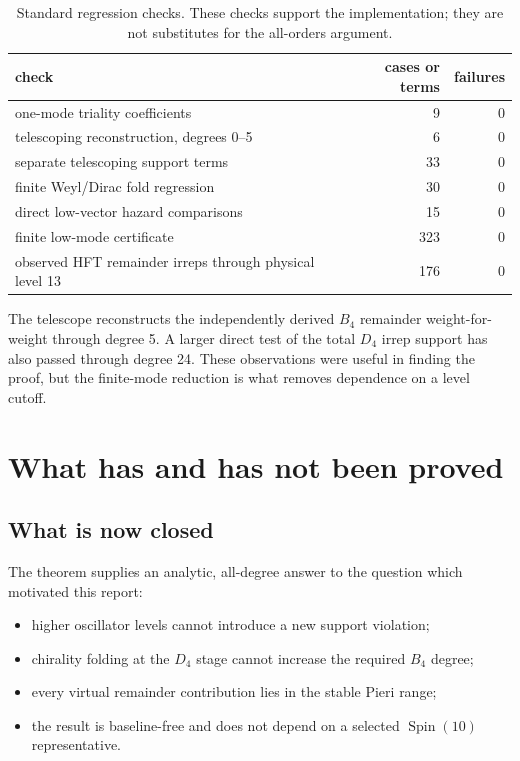 \documentclass[11pt,a4paper]{article}
\theoremstyle{definition}
\newcommand{\Spin}{\operatorname{Spin}}
\begin{document}
\begin{table}[ht]
\centering
\caption{Standard regression checks.  These checks support the implementation;
they are not substitutes for the all-orders argument.}
\label{tab:checks}
\begin{tabularx}{\textwidth}{Xrr}
\toprule
check & cases or terms & failures \\
\midrule
one-mode triality coefficients & 9 & 0 \\
telescoping reconstruction, degrees 0--5 & 6 & 0 \\
separate telescoping support terms & 33 & 0 \\
finite Weyl/Dirac fold regression & 30 & 0 \\
direct low-vector hazard comparisons & 15 & 0 \\
finite low-mode certificate & 323 & 0 \\
observed HFT remainder irreps through physical level 13 & 176 & 0 \\
\bottomrule
\end{tabularx}
\end{table}

The telescope reconstructs the independently derived $B_4$ remainder
weight-for-weight through degree 5.  A larger direct test of the total
$D_4$ irrep support has also passed through degree 24.  These observations
were useful in finding the proof, but the finite-mode reduction is what
removes dependence on a level cutoff.

\section{What has and has not been proved}

\subsection{What is now closed}

The theorem supplies an analytic, all-degree answer to the question which
motivated this report:
\begin{itemize}
  \item higher oscillator levels cannot introduce a new support violation;
  \item chirality folding at the $D_4$ stage cannot increase the required
        $B_4$ degree;
  \item every virtual remainder contribution lies in the stable Pieri range;
  \item the result is baseline-free and does not depend on a selected
        $\Spin(10)$ representative.
\end{itemize}
\end{document}
